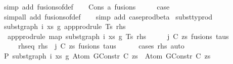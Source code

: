 \begin{isabellebody}
\ {\isacharparenleft}{\kern0pt}simp\ add{\isacharcolon}{\kern0pt}\ fusions{\isacharunderscore}{\kern0pt}of{\isacharunderscore}{\kern0pt}def{\isacharparenright}{\kern0pt}\isanewline
{}\isamarkupfalse%
\isanewline
\ \ \isamarkupfalse%
\ {\isacharparenleft}{\kern0pt}Cons\ a\ fusions{\isacharparenright}{\kern0pt}\isanewline
\ \ \isamarkupfalse%
\ \isamarkupfalse%
\ {\isacharquery}{\kern0pt}case\isanewline
\ \ \isamarkupfalse%
\ {\isacharparenleft}{\kern0pt}simp{\isacharunderscore}{\kern0pt}all\ add{\isacharcolon}{\kern0pt}\ fusions{\isacharunderscore}{\kern0pt}of{\isacharunderscore}{\kern0pt}def{\isacharparenright}{\kern0pt}\isanewline
\ \ \isamarkupfalse%
\ {\isacharparenleft}{\kern0pt}simp\ add{\isacharcolon}{\kern0pt}\ case{\isacharunderscore}{\kern0pt}prod{\isacharunderscore}{\kern0pt}beta{\isacharparenright}{\kern0pt}\isanewline
{}\isamarkupfalse%
%
\endisatagproof
{\isafoldproof}%
%
\isadelimproof
\isanewline
%
\endisadelimproof
\isanewline
\isanewline
{}\isamarkupfalse%
\ subst{\isacharunderscore}{\kern0pt}typrod{\isacharcolon}{\kern0pt}\isanewline
\ {\isachardoublequoteopen}subst{\isacharunderscore}{\kern0pt}graph\ i\ xs\ g{}\ {\isacharparenleft}{\kern0pt}app{\isacharunderscore}{\kern0pt}prodrule\ Ts\ rhs{\isacharparenright}{\kern0pt}\ {\isacharequal}{\kern0pt}\isanewline
\ \ app{\isacharunderscore}{\kern0pt}prodrule\ {\isacharparenleft}{\kern0pt}map\ {\isacharparenleft}{\kern0pt}subst{\isacharunderscore}{\kern0pt}graph\ i\ xs\ g{}{\isacharparenright}{\kern0pt}\ Ts{\isacharparenright}{\kern0pt}\ rhs{\isachardoublequoteclose}\isanewline
%
\isadelimproof
%
\endisadelimproof
%
\isatagproof
{}\isamarkupfalse%
\ {\isacharminus}{\kern0pt}\isanewline
\ \ \isamarkupfalse%
\ j\ C\ zs\ fusions\ taus\isanewline
\ \ \ \ \ rhs{\isacharunderscore}{\kern0pt}eq{\isacharcolon}{\kern0pt}\ {\isachardoublequoteopen}rhs\ {\isacharequal}{\kern0pt}\ {\isacharparenleft}{\kern0pt}j{\isacharcomma}{\kern0pt}\ {\isacharparenleft}{\kern0pt}C{\isacharcomma}{\kern0pt}\ zs{\isacharparenright}{\kern0pt}{\isacharcomma}{\kern0pt}\ fusions{\isacharcomma}{\kern0pt}\ taus{\isacharparenright}{\kern0pt}{\isachardoublequoteclose}\isanewline
\ \ \ \ \isamarkupfalse%
\ {\isacharparenleft}{\kern0pt}cases\ rhs{\isacharparenright}{\kern0pt}\ auto\isanewline
\isanewline
\ \ \isamarkupfalse%
\ P{}{\isacharcolon}{\kern0pt}\ {\isachardoublequoteopen}subst{\isacharunderscore}{\kern0pt}graph\ i\ xs\ g{}\ {\isacharparenleft}{\kern0pt}Atom\ {\isacharparenleft}{\kern0pt}GConstr\ C{\isacharparenright}{\kern0pt}\ zs{\isacharparenright}{\kern0pt}\ {\isacharequal}{\kern0pt}\ Atom\ {\isacharparenleft}{\kern0pt}GConstr\ C{\isacharparenright}{\kern0pt}\ zs{\isachardoublequoteclose}\isanewline

\end{isabellebody}
